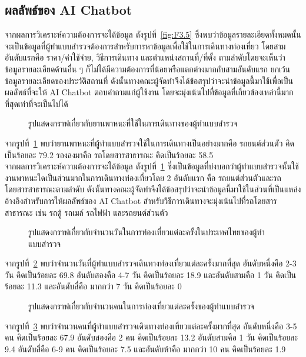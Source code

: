 \documentclass[12pt,oneside,openright,a4paper]{cpe-thai-project}
\begin{document}
\subsection{ผลลัพธ์ของ AI Chatbot}
จากผลการวิเคราะห์ความต้องการจะได้ข้อมูล ดังรูปที่~\ref{fig:F3.5} ซึ่งพบว่าข้อมูลรายละเอียดทั้งหมดนั้นจะเป็นข้อมูลที่ผู้ทำแบบสำรวจต้องการสำหรับการหาข้อมูลเพื่อใช้ในการเดินทางท่องเที่ยว โดยสามอันดับแรกคือ ราคา/ค่าใช้จ่าย, วิธีการเดินทาง และตำแหน่งสถานที่/ที่ตั้ง ตามลำดับโดยจะเห็นว่าข้อมูลรายละเอียดด้านอื่น ๆ
ก็ไม่ได้มีความต้องการที่น้อยหรือแตกต่างมากกับสามอันดับแรก ยกเว้นข้อมูลรายละเอียดของประวัติสถานที่ ดังนั้นทางคณะผู้จัดทำจึงได้ข้อสรุปว่าจะนำข้อมูลนี้มาใช้เพื่อเป็นผลลัพธ์ที่จะให้ AI Chatbot ตอบคำถามแก่ผู้ใช้งาน โดยจะมุ่งเน้นไปที่ข้อมูลที่เกี่ยวข้องเหล่านี้มากที่สุดเท่าที่จะเป็นไปได้ \newpage

\begin{figure}[!h]\centering
\setlength{\fboxrule}{0mm}
\caption{รูปแสดงกราฟเกี่ยวกับยานพาหนะที่ใช้ในการเดินทางของผู้ทำแบบสำรวจ}\label{fig:F3.12}
\end{figure}
จากรูปที่~\ref{fig:F3.12} พบว่ายานพาหนะที่ผู้ทำแบบสำรวจใช้ในการเดินทางเป็นอย่างมากคือ รถยนต์ส่วนตัว คิดเป็นร้อยละ 79.2 รองลงมาคือ รถโดยสารสาธารณะ คิดเป็นร้อยละ 58.5 \\

จากผลการวิเคราะห์ความต้องการจะได้ข้อมูล ดังรูปที่~\ref{fig:F3.12} ซึ่งเป็นข้อมูลที่บ่งบอกว่าผู้ทำแบบสำรวจนั้นใช้งานพาหนะใดเป็นส่วนมากในการเดินทางท่องเที่ยวโดย 2 อันดับแรก คือ รถยนต์ส่วนตัวและรถโดยสารสาธารณะตามลำดับ ดังนั้นทางคณะผู้จัดทำจึงได้ข้อสรุปว่าจะนำข้อมูลนี้มาใช้ในส่วนที่เป็นแหล่งอ้างอิงสำหรับการให้ผลลัพธ์ของ AI Chatbot สำหรับวิธีการเดินทางจะมุ่งเน้นไปที่รถโดยสารสาธารณะ เช่น รถตู้ รถเมล์ รถไฟฟ้า และรถยนต์ส่วนตัว \\

\begin{figure}[!h]\centering
\setlength{\fboxrule}{0mm}
\caption{รูปแสดงกราฟเกี่ยวกับจำนวนวันในการท่องเที่ยวแต่ละครั้งในประเทศไทยของผู้ทำแบบสำรวจ}\label{fig:F3.13}
\end{figure}
จากรูปที่~\ref{fig:F3.13} พบว่าจำนวนวันที่ผู้ทำแบบสำรวจเดินทางท่องเที่ยวแต่ละครั้งมากที่สุด อันดับหนึ่งคือ 2-3 วัน คิดเป็นร้อยละ 69.8 อันดับสองคือ 4-7 วัน คิดเป็นร้อยละ 18.9 และอันดับสามคือ 1 วัน คิดเป็นร้อยละ 11.3 และอันดับสี่คือ มากกว่า 7 วัน คิดเป็นร้อยละ 0 \newpage

\begin{figure}[!h]\centering
\setlength{\fboxrule}{0mm}
\caption{รูปแสดงกราฟเกี่ยวกับจำนวนคนในการท่องเที่ยวแต่ละครั้งของผู้ทำแบบสำรวจ}\label{fig:F3.14}
\end{figure}
จากรูปที่~\ref{fig:F3.14} พบว่าจำนวนคนที่ผู้ทำแบบสำรวจเดินทางท่องเที่ยวแต่ละครั้งมากที่สุด อันดับหนึ่งคือ 3-5 คน คิดเป็นร้อยละ 67.9 อันดับสองคือ 2 คน คิดเป็นร้อยละ 13.2 อันดับสามคือ 1 วัน คิดเป็นร้อยละ 9.4 อันดับสี่คือ 6-9 คน คิดเป็นร้อยละ 7.5 และอันดับห้าคือ มากกว่า 10 คน คิดเป็นร้อยละ 1.9 \\
\end{document}
